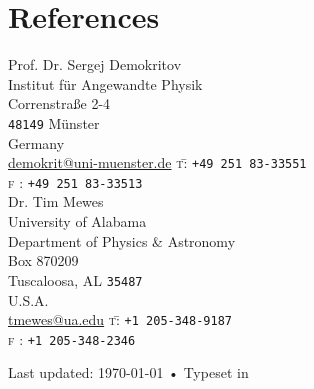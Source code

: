 \documentclass[svgnames, 10pt, a4paper]{article}
\newenvironment{nstabbing}
  {\setlength{\topsep}{0pt}%
   \setlength{\partopsep}{0pt}%
   \tabbing}
  {\endtabbing}
\begin{document}
\section*{References}
\noindent
Prof. Dr. Sergej Demokritov\\
Institut für Angewandte Physik\\
Correnstraße 2-4\\
\texttt{48149} Münster\\
Germany\\
\href{mailto:demokrit@uni-muenster.de}{demokrit@uni-muenster.de}
\begin{nstabbing}
\textsc{t}\= : \texttt{+49 251 83-33551}\\
\textsc{f}\> : \texttt{+49 251 83-33513}\\[.2cm]
\end{nstabbing}
\noindent
Dr. Tim Mewes\\
University of Alabama\\
Department of Physics \& Astronomy\\
Box 870209\\
Tuscaloosa, AL \texttt{35487}\\
U.S.A.\\
\href{mailto:tmewes@ua.edu}{tmewes@ua.edu}
\begin{nstabbing}
\textsc{t}\= : \texttt{+1 205-348-9187}\\
\textsc{f}\> : \texttt{+1 205-348-2346}
\end{nstabbing}
\vfill
\begin{center}
{\scriptsize  Last updated: \today\- •\- 
Typeset in \href{http://nitens.org/taraborelli/cvtex}{
\XeTeX }\\
\href{}{}}
\end{center}
\end{document}
